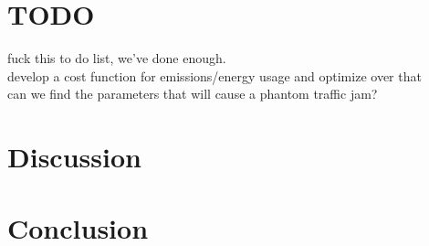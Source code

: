 \documentclass[12pt]{article}
\begin{document}
\section{TODO}
fuck this to do list, we've done enough. \\
develop a cost function for emissions/energy usage and optimize over that \\
can we find the parameters that will cause a phantom traffic jam?


\section{Discussion}

\section{Conclusion}



\newpage



\end{document}

